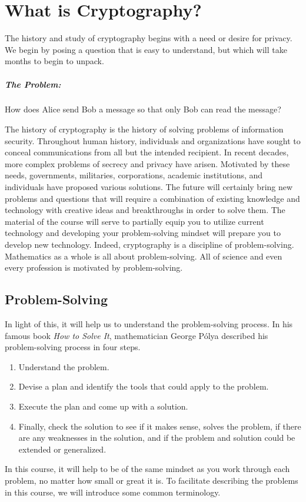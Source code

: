 \chapter{What is Cryptography?}

The history and study of cryptography begins with a need or desire for privacy. We begin by posing a question that is easy to understand, but which will take months to begin to unpack.

\paragraph*{The Problem:} How does Alice send Bob a message so that only Bob can read the message?

	The history of cryptography is the history of solving problems of information security. Throughout human history, individuals and organizations have sought to conceal communications from all but the intended recipient. In recent decades, more complex problems of secrecy and privacy have arisen. Motivated by these needs, governments, militaries, corporations, academic institutions, and individuals have proposed various solutions. The future will certainly bring new problems and questions that will require a combination of existing knowledge and technology with creative ideas and breakthroughs in order to solve them. The material of the course will serve to partially equip you to utilize current technology and developing your problem-solving mindset will prepare you to develop new technology. Indeed, cryptography is a discipline of problem-solving. Mathematics as a whole is all about problem-solving. All of science and even every profession is motivated by problem-solving.

	\section{Problem-Solving}

In light of this, it will help us to understand the problem-solving process. In his famous book {\em How to Solve It}, mathematician George P\'{o}lya  described his problem-solving process in four steps.
\begin{enumerate}
	\item Understand the problem.
	\item Devise a plan and identify the tools that could apply to the problem.
	\item Execute the plan and come up with a solution.
	\item Finally, check the solution to see if it makes sense, solves the problem, if there are any weaknesses in the solution, and if the problem and solution could be extended or generalized.
\end{enumerate}
In this course, it will help to be of the same mindset as you work through each problem, no matter how small or great it is. To facilitate describing the problems in this course, we will introduce some common terminology.


